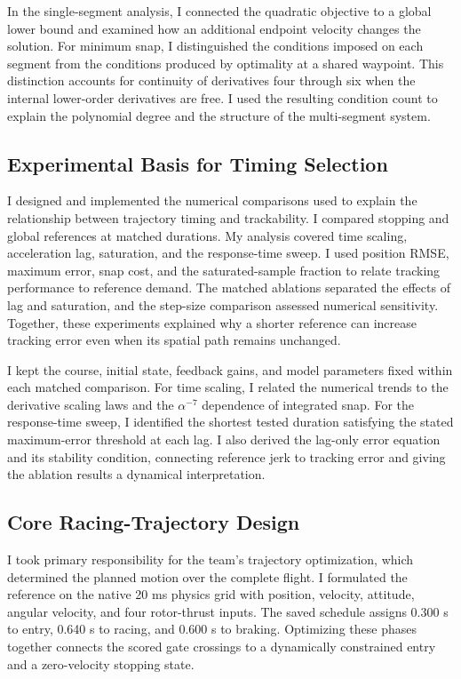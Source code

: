 \documentclass[letterpaper,10pt,conference]{ieeeconf}
\begin{document}
In the single-segment analysis, I connected the quadratic objective to a global lower bound and examined how an additional endpoint velocity changes the solution.
For minimum snap, I distinguished the conditions imposed on each segment from the conditions produced by optimality at a shared waypoint.
This distinction accounts for continuity of derivatives four through six when the internal lower-order derivatives are free.
I used the resulting condition count to explain the polynomial degree and the structure of the multi-segment system.

\subsection{Experimental Basis for Timing Selection}
I designed and implemented the numerical comparisons used to explain the relationship between trajectory timing and trackability.
I compared stopping and global references at matched durations.
My analysis covered time scaling, acceleration lag, saturation, and the response-time sweep.
I used position RMSE, maximum error, snap cost, and the saturated-sample fraction to relate tracking performance to reference demand.
The matched ablations separated the effects of lag and saturation, and the step-size comparison assessed numerical sensitivity.
Together, these experiments explained why a shorter reference can increase tracking error even when its spatial path remains unchanged.

I kept the course, initial state, feedback gains, and model parameters fixed within each matched comparison.
For time scaling, I related the numerical trends to the derivative scaling laws and the $\alpha^{-7}$ dependence of integrated snap.
For the response-time sweep, I identified the shortest tested duration satisfying the stated maximum-error threshold at each lag.
I also derived the lag-only error equation and its stability condition, connecting reference jerk to tracking error and giving the ablation results a dynamical interpretation.

\subsection{Core Racing-Trajectory Design}
I took primary responsibility for the team's trajectory optimization, which determined the planned motion over the complete flight.
I formulated the reference on the native 20 ms physics grid with position, velocity, attitude, angular velocity, and four rotor-thrust inputs.
The saved schedule assigns 0.300 s to entry, 0.640 s to racing, and 0.600 s to braking.
Optimizing these phases together connects the scored gate crossings to a dynamically constrained entry and a zero-velocity stopping state.
\end{document}
